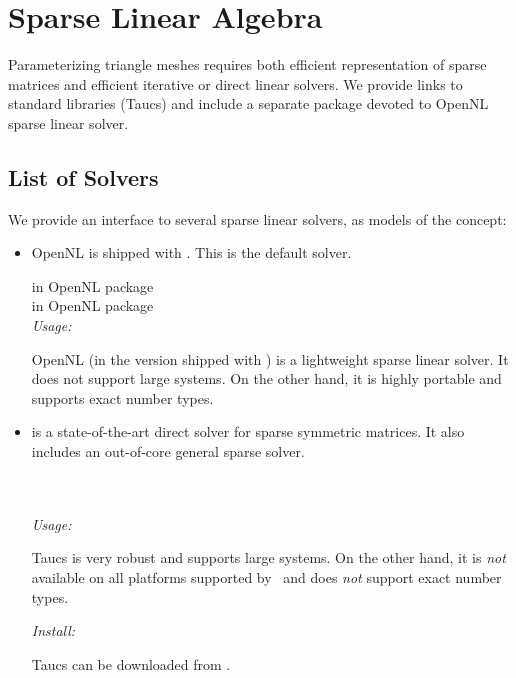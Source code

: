 \section{Sparse Linear Algebra}
\label{sec:Sparse-Linear-Algebra}

Parameterizing triangle meshes requires both efficient representation
of sparse matrices and efficient iterative or direct linear
solvers. We provide links to standard libraries ({\sc Taucs})
and include a separate package devoted to OpenNL sparse linear solver.

\subsection{List of Solvers}

We provide an interface to several sparse linear solvers, as models
of the  concept:

\begin{itemize}

\item
    OpenNL \cite{cgal:l-nmdgp-05} is shipped with \cgal. This is the default solver.

     in OpenNL package  \\
     in OpenNL package  \\

    \emph{Usage:}

    OpenNL (in the version shipped with \cgal) is a lightweight sparse linear solver.
    It does not support large systems.
    On the other hand, it is highly portable and supports exact number types.

\item
    is a state-of-the-art direct solver for sparse symmetric matrices.
    It also includes an out-of-core general sparse solver.

      \\
      \\

    \emph{Usage:}

    {\sc Taucs} is very robust and supports large systems.
    On the other hand, it is \emph{not} available on all platforms
    supported by \cgal\ and does \emph{not} support exact number types.

    \emph{Install:}

    {\sc Taucs} can be downloaded from
    {}.

\end{itemize}


